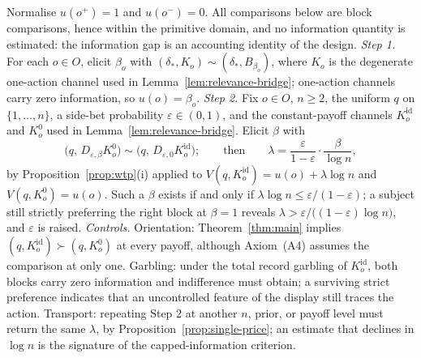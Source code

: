 \begin{remark}\label{rem:elicitation}
Normalise $u(o^+)=1$ and $u(o^-)=0$.  All comparisons below are block comparisons, hence within the primitive
domain, and no information quantity is estimated: the information gap is an accounting identity of the design.
\emph{Step 1.}  For each $o\in O$, elicit $\beta_o$ with $(\delta_\ast,K_o)\sim(\delta_\ast,B_{\beta_o})$, where
$K_o$ is the degenerate one-action channel used in Lemma~\ref{lem:relevance-bridge}; one-action channels carry zero information, so
$u(o)=\beta_o$.
\emph{Step 2.}  Fix $o\in O$, $n\ge2$, the uniform $q$ on $\{1,\dots,n\}$, a side-bet probability $\varepsilon\in(0,1)$, and
the constant-payoff channels $K^{\mathrm{id}}_o$ and $K^0_o$ used in Lemma~\ref{lem:relevance-bridge}.  Elicit $\beta$ with
\[
 \bigl(q,\,D_{\varepsilon,\beta}K^{0}_o\bigr)\sim\bigl(q,\,D_{\varepsilon,0}K^{\mathrm{id}}_o\bigr);
 \qquad\text{then}\qquad
 \lambda=\frac{\varepsilon}{1-\varepsilon}\cdot\frac{\beta}{\log n},
\]
by Proposition~\ref{prop:wtp}\textup{(i)} applied to $V(q,K^{\mathrm{id}}_o)=u(o)+\lambda\log n$ and
$V(q,K^{0}_o)=u(o)$.  Such a $\beta$ exists if and only if $\lambda\log n\le\varepsilon/(1-\varepsilon)$; a
subject still strictly preferring the right block at $\beta=1$ reveals
$\lambda>\varepsilon/\bigl((1-\varepsilon)\log n\bigr)$, and $\varepsilon$ is raised.
\emph{Controls.}  Orientation: Theorem~\ref{thm:main} implies
$(q,K^{\mathrm{id}}_o)\succ(q,K^{0}_o)$ at every payoff, although Axiom~\textup{(A4)} assumes the comparison at only one.  Garbling:
under the total record garbling of $K^{\mathrm{id}}_o$, both blocks carry zero information and indifference must
obtain; a surviving strict preference indicates that an uncontrolled feature of the display still traces the
action.  Transport: repeating Step 2 at another $n$, prior, or payoff level must return the same $\lambda$, by
Proposition~\ref{prop:single-price}; an estimate that declines in $\log n$ is the signature of the
capped-information criterion.
\end{remark}
